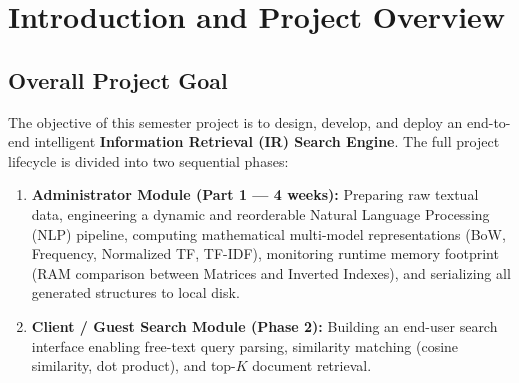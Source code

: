 \documentclass[11pt,a4paper]{article}
\begin{document}
\section{Introduction and Project Overview}

\subsection{Overall Project Goal}
The objective of this semester project is to design, develop, and deploy an end-to-end intelligent \textbf{Information Retrieval (IR) Search Engine}. The full project lifecycle is divided into two sequential phases:
\begin{enumerate}[label=\textbf{Phase \arabic*:}]
    \item \textbf{Administrator Module (Part 1 --- 4 weeks):} Preparing raw textual data, engineering a dynamic and reorderable Natural Language Processing (NLP) pipeline, computing mathematical multi-model representations (BoW, Frequency, Normalized TF, TF-IDF), monitoring runtime memory footprint (RAM comparison between Matrices and Inverted Indexes), and serializing all generated structures to local disk.
    \item \textbf{Client / Guest Search Module (Phase 2):} Building an end-user search interface enabling free-text query parsing, similarity matching (cosine similarity, dot product), and top-$K$ document retrieval.
\end{enumerate}
\end{document}
